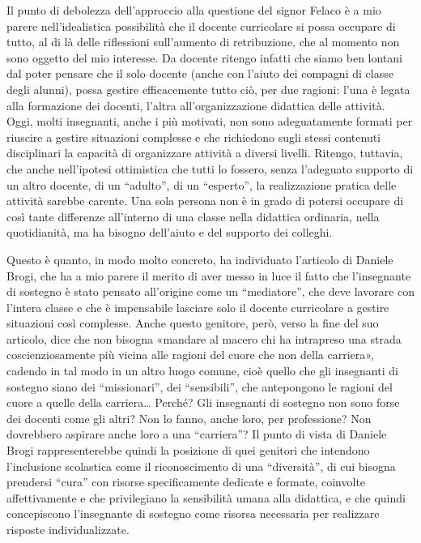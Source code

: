 Il punto di debolezza dell'approccio alla questione del signor Felaco è a mio parere nell'idealistica possibilità che il docente curricolare si possa occupare di tutto, al di là delle riflessioni sull'aumento di retribuzione, che al momento non sono oggetto del mio interesse. Da docente ritengo infatti che siamo ben lontani dal poter pensare che il solo docente (anche con l'aiuto dei compagni di classe degli alunni), possa gestire efficacemente tutto ciò, per due ragioni: l'una è legata alla formazione dei docenti, l'altra all'organizzazione didattica delle attività.
Oggi, molti insegnanti, anche i più motivati, non sono adeguatamente formati per riuscire a gestire situazioni complesse e che richiedono sugli stessi contenuti disciplinari la capacità di organizzare attività a diversi livelli. Ritengo, tuttavia, che anche nell'ipotesi ottimistica che tutti lo fossero, senza l'adeguato supporto di un altro docente, di un “adulto”, di un “esperto”, la realizzazione pratica delle attività sarebbe carente. Una sola persona non è in grado di potersi occupare di così tante differenze all'interno di una classe nella didattica ordinaria, nella quotidianità, ma ha bisogno dell'aiuto e del supporto dei colleghi.

Questo è quanto, in modo molto concreto, ha individuato l'articolo di Daniele Brogi, che ha a mio parere il merito di aver messo in luce il fatto che l'insegnante di sostegno è stato pensato all'origine come un “mediatore”, che deve lavorare con l'intera classe e che è impensabile lasciare solo il docente curricolare a gestire situazioni così complesse.
Anche questo genitore, però, verso la fine del suo articolo, dice che non bisogna «mandare al macero chi ha intrapreso una strada coscienziosamente più vicina alle ragioni del cuore che non della carriera», cadendo in tal modo in un altro luogo comune, cioè quello che gli insegnanti di sostegno siano dei “missionari”, dei “sensibili”, che antepongono le ragioni del cuore a quelle della carriera… Perché? Gli insegnanti di sostegno non sono forse dei docenti come gli altri? Non lo fanno, anche loro, per professione? Non dovrebbero aspirare anche loro a una “carriera”?
Il punto di vista di Daniele Brogi rappresenterebbe quindi la posizione di quei genitori che intendono l'inclusione scolastica come il riconoscimento di una “diversità”, di cui bisogna prendersi “cura” con risorse specificamente dedicate e formate, coinvolte affettivamente e che privilegiano la sensibilità umana alla didattica, e che quindi concepiscono l'insegnante di sostegno come risorsa necessaria per realizzare risposte individualizzate.

